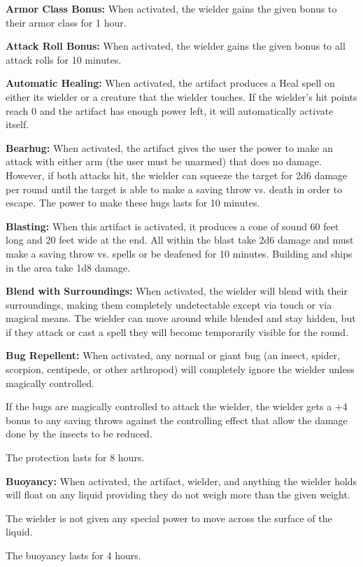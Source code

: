 \begin{multicols*}{2}
\textbf{Armor Class Bonus:} When activated, the wielder gains the given bonus to their armor class for 1 hour.

\textbf{Attack Roll Bonus:} When activated, the wielder gains the given bonus to all attack rolls for 10 minutes.

\textbf{Automatic Healing:} When activated, the artifact produces a Heal spell on either its wielder or a creature that the wielder touches. If the wielder’s hit points reach 0 and the artifact has enough power left, it will automatically activate itself.

\textbf{Bearhug:} When activated, the artifact gives the user the power to make an attack with either arm (the user must be unarmed) that does no damage. However, if both attacks hit, the wielder can squeeze the target for 2d6 damage per round until the target is able to make a saving throw vs. death in order to escape. The power to make these hugs lasts for 10 minutes.

\textbf{Blasting:} When this artifact is activated, it produces a cone of sound 60 feet long and 20 feet wide at the end. All within the blast take 2d6 damage and must make a saving throw vs. spells or be deafened for 10 minutes. Building and ships in the area take 1d8 damage.

\textbf{Blend with Surroundings:} When activated, the wielder will blend with their surroundings, making them completely undetectable except via touch or via magical means. The wielder can move around while blended and stay hidden, but if they attack or cast a spell they will become temporarily visible for the round.

\textbf{Bug Repellent:} When activated, any normal or giant bug (an insect, spider, scorpion, centipede, or other arthropod) will completely ignore the wielder unless magically controlled.

If the bugs are magically controlled to attack the wielder, the wielder gets a +4 bonus to any saving throws against the controlling effect that allow the damage done by the insects to be reduced.

The protection lasts for 8 hours.

\textbf{Buoyancy:} When activated, the artifact, wielder, and anything the wielder holds will float on any liquid providing they do not weigh more than the given weight.

The wielder is not given any special power to move across the surface of the liquid.

The buoyancy lasts for 4 hours.


\end{multicols*}
